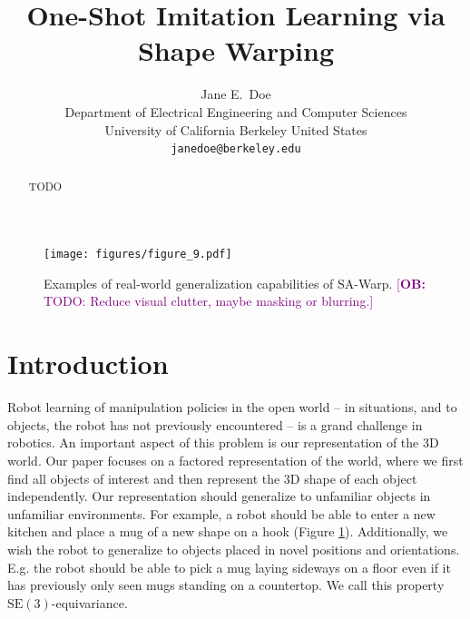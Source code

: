 \documentclass{article}
\title{One-Shot Imitation Learning via Shape Warping}
\author{
  Jane E.~Doe\\
  Department of Electrical Engineering and Computer Sciences\\
  University of California Berkeley 
  United States\\
  \texttt{janedoe@berkeley.edu} \\
}
\newcommand{\ob}[1]{\textcolor{purple}{[\textbf{OB:} #1]}}
\begin{document}
\maketitle


\begin{abstract}
TODO
\end{abstract}



\begin{figure}[h]
    \centering
    \texttt{[image: figures/figure\_9.pdf]}
    \caption{Examples of real-world generalization capabilities of SA-Warp. \ob{TODO: Reduce visual clutter, maybe masking or blurring.}}
    \label{fig:intro}
\end{figure}

\section{Introduction}

Robot learning of manipulation policies in the open world -- in situations, and to objects, the robot has not previously encountered -- is a grand challenge in robotics. An important aspect of this problem is our representation of the 3D world. Our paper focuses on a factored representation of the world, where we first find all objects of interest and then represent the 3D shape of each object independently. Our representation should generalize to unfamiliar objects in unfamiliar environments. For example, a robot should be able to enter a new kitchen and place a mug of a new shape on a hook (Figure \ref{fig:intro}). Additionally, we wish the robot to generalize to objects placed in novel positions and orientations. E.g. the robot should be able to pick a mug laying sideways on a floor even if it has previously only seen mugs standing on a countertop. We call this property $\mathrm{SE}(3)$-equivariance.
\end{document}
